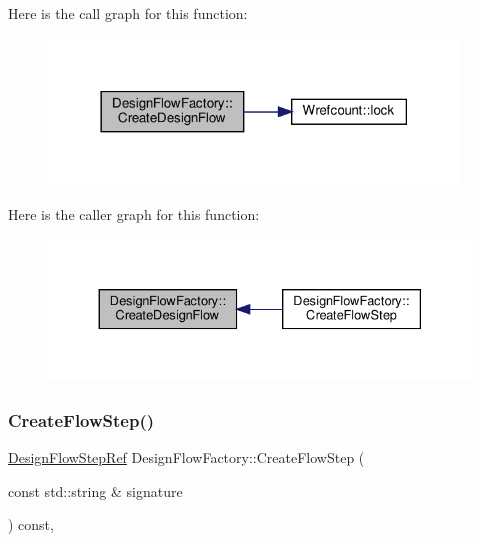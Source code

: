 Here is the call graph for this function\+:
\nopagebreak
\begin{figure}[H]
\begin{center}
\leavevmode
\includegraphics[width=309pt]{d7/d9e/classDesignFlowFactory_af22b8c314d4b1ea742ab2527a98bc1de_cgraph}
\end{center}
\end{figure}
Here is the caller graph for this function\+:
\nopagebreak
\begin{figure}[H]
\begin{center}
\leavevmode
\includegraphics[width=330pt]{d7/d9e/classDesignFlowFactory_af22b8c314d4b1ea742ab2527a98bc1de_icgraph}
\end{center}
\end{figure}
\mbox{\label{classDesignFlowFactory_a4dd446831a1e7d6f5af137beff1d4cab}} 
\subsubsection{\texorpdfstring{Create\+Flow\+Step()}{CreateFlowStep()}}
{\footnotesize\ttfamily \hyperlink{design__flow__step_8hpp_a9dd6b4474ddf52d41a78b1aaa12ae6c8}{Design\+Flow\+Step\+Ref} Design\+Flow\+Factory\+::\+Create\+Flow\+Step (\begin{DoxyParamCaption}\item[{const std\+::string \&}]{signature }\end{DoxyParamCaption}) const\hspace{0.3cm}{\ttfamily [override]}, {\ttfamily [virtual]}}



